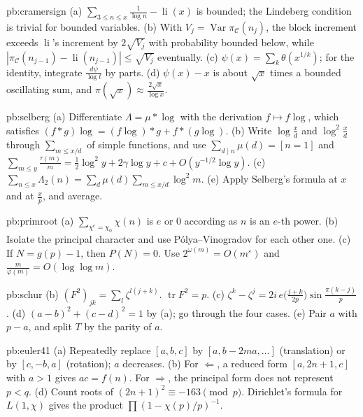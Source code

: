 \begin{hint}{pb:cramersign}
(a) $\sum_{3\le n\le x}\frac1{\log n}-\operatorname{li}(x)$ is bounded; the Lindeberg condition is trivial for bounded variables. (b) With $V_j=\operatorname{Var}\pi_{\mathcal C}(n_j)$, the
block increment exceeds $\operatorname{li}$'s increment by $2\sqrt{V_j}$ with probability bounded below, while $|\pi_{\mathcal C}(n_{j-1})-\operatorname{li}(n_{j-1})|\le\sqrt{V_j}$
eventually. (c) $\psi(x)=\sum_k\theta(x^{1/k})$; for the identity, integrate $\frac{d\psi}{\log t}$ by parts. (d) $\psi(x)-x$ is about $\sqrt x$ times a bounded
oscillating sum, and $\pi(\sqrt x)\approx\frac{2\sqrt x}{\log x}$.
\end{hint}

\begin{hint}{pb:selberg}
(a) Differentiate $\Lambda=\mu*\log$ with the derivation $f\mapsto f\log$, which satisfies $(f*g)\log=(f\log)*g+f*(g\log)$. (b) Write $\log\frac xd$ and $\log^2\frac xd$ through
$\sum_{m\le x/d}$ of simple functions, and use $\sum_{d\mid n}\mu(d)=[n=1]$ and $\sum_{m\le y}\frac{\tau(m)}m=\frac12\log^2y+2\gamma\log y+c+O(y^{-1/2}\log y)$. (c) $\sum_{n\le x}\Lambda_2(n)=\sum_d\mu(d)\sum_{m\le x/d}\log^2m$.
(e) Apply Selberg's formula at $x$ and at $\frac xp$, and average.
\end{hint}

\begin{hint}{pb:primroot}
(a) $\sum_{\chi^e=\chi_0}\chi(n)$ is $e$ or $0$ according as $n$ is an $e$-th power. (b) Isolate the principal character and use Pólya--Vinogradov for each other one.
(c) If $N=g(p)-1$, then $P(N)=0$. Use $2^{\omega(m)}=O(m^\varepsilon)$ and $\frac m{\varphi(m)}=O(\log\log m)$.
\end{hint}

\begin{hint}{pb:schur}
(b) $(F^2)_{jk}=\sum_l\zeta^{l(j+k)}$. $\operatorname{tr}F^2=p$. (c) $\zeta^k-\zeta^j=2i\,e\bigl(\frac{j+k}{2p}\bigr)\sin\frac{\pi(k-j)}p$. (d) $(a-b)^2+(c-d)^2=1$ by (a); go through the
four cases. (e) Pair $a$ with $p-a$, and split $T$ by the parity of $a$.
\end{hint}

\begin{hint}{pb:euler41}
(a) Repeatedly replace $[a,b,c]$ by $[a,b-2ma,\dots]$ (translation) or by $[c,-b,a]$ (rotation); $a$ decreases. (b) For $\Leftarrow$, a reduced form $[a,2n+1,c]$ with $a>1$ gives
$ac=f(n)$. For $\Rightarrow$, the principal form does not represent $p<q$. (d) Count roots of $(2n+1)^2\equiv-163\pmod p$. Dirichlet's formula for $L(1,\chi)$ gives the
product $\prod(1-\chi(p)/p)^{-1}$.
\end{hint}

